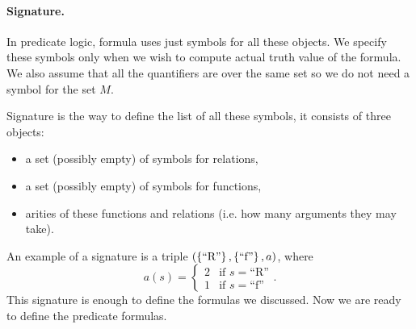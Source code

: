 \paragraph{Signature.}
In predicate logic, formula uses just symbols for all these objects. We specify
these symbols only when we wish to compute actual truth value of the formula.
We also assume that all the quantifiers are over the same set so we do not need
a symbol for the set $M$.

Signature is the way to define the list of all these symbols, it consists of
three objects:
\begin{itemize}
  \item a set (possibly empty) of symbols for relations,
  \item a set (possibly empty) of symbols for functions,
  \item arities of these functions and relations (i.e. how many arguments they
    may take).
\end{itemize}
An example of a signature is a triple $(\set{\text{``R''}}, \set{\text{``f''}},
a)$, where
\[
  a(s) = \begin{cases}
    2 & \text{if } s =  \text{``R''} \\
    1 & \text{if } s =  \text{``f''}
  \end{cases}.
\]
This signature is enough to define the formulas we discussed. Now we are ready
to define the predicate formulas.


